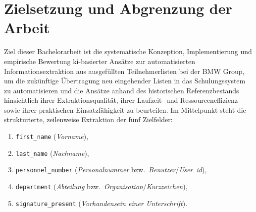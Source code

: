 \section{Zielsetzung und Abgrenzung der Arbeit}
\label{sec:zielsetzung}

Ziel dieser Bachelorarbeit ist die systematische Konzeption, Implementierung und empirische Bewertung \ac{ki}-basierter Ansätze zur automatisierten Informationsextraktion aus ausgefüllten Teilnehmerlisten bei der BMW Group, um die zukünftige Übertragung neu eingehender Listen in das Schulungssystem zu automatisieren und die Ansätze anhand des historischen Referenzbestands hinsichtlich ihrer Extraktionsqualität, ihrer Laufzeit- und Ressourceneffizienz sowie ihrer praktischen Einsatzfähigkeit zu beurteilen. Im Mittelpunkt steht die strukturierte, zeilenweise Extraktion der fünf Zielfelder:
\begin{enumerate}
  \item \texttt{first\_name} (\emph{Vorname}),
  \item \texttt{last\_name} (\emph{Nachname}),
  \item \texttt{personnel\_number} (\emph{Personalnummer} bzw.\ \emph{Benutzer}/\emph{User~\ac{id}}),
  \item \texttt{department} (\emph{Abteilung} bzw.\ \emph{Organisation}/\emph{Kurzzeichen}),
  \item \texttt{signature\_present} (\emph{Vorhandensein einer Unterschrift}).
\end{enumerate}

